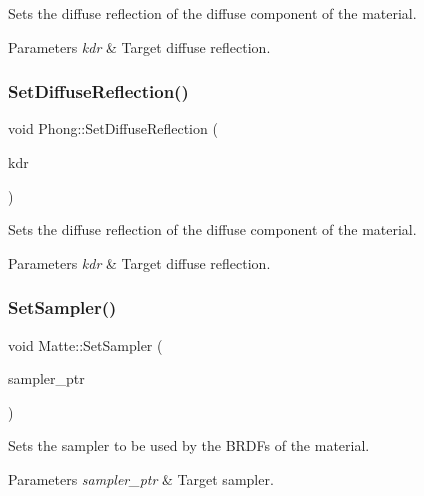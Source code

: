 Sets the diffuse reflection of the diffuse component of the material. 
\begin{DoxyParams}{Parameters}
{\em kdr} & Target diffuse reflection. \\
\hline
\end{DoxyParams}
\hypertarget{group___materials_ga7d9198210719a327b6c293955a9ecafe}{}\label{group___materials_ga7d9198210719a327b6c293955a9ecafe} 
\subsubsection{\texorpdfstring{Set\+Diffuse\+Reflection()}{SetDiffuseReflection()}\hspace{0.1cm}{\footnotesize\ttfamily [2/2]}}
{\footnotesize\ttfamily void Phong\+::\+Set\+Diffuse\+Reflection (\begin{DoxyParamCaption}\item[{const float}]{kdr }\end{DoxyParamCaption})\hspace{0.3cm}{\ttfamily [inline]}}

Sets the diffuse reflection of the diffuse component of the material. 
\begin{DoxyParams}{Parameters}
{\em kdr} & Target diffuse reflection. \\
\hline
\end{DoxyParams}
\hypertarget{group___materials_ga6b42d7c8b02c61801702dc19d8e3ba5a}{}\label{group___materials_ga6b42d7c8b02c61801702dc19d8e3ba5a} 
\subsubsection{\texorpdfstring{Set\+Sampler()}{SetSampler()}\hspace{0.1cm}{\footnotesize\ttfamily [1/2]}}
{\footnotesize\ttfamily void Matte\+::\+Set\+Sampler (\begin{DoxyParamCaption}\item[{std\+::shared\+\_\+ptr$<$ \hyperlink{class_sampler}{Sampler} $>$}]{sampler\+\_\+ptr }\end{DoxyParamCaption})\hspace{0.3cm}{\ttfamily [inline]}}

Sets the sampler to be used by the B\+R\+D\+Fs of the material. 
\begin{DoxyParams}{Parameters}
{\em sampler\+\_\+ptr} & Target sampler. \\
\hline
\end{DoxyParams}
\hypertarget{group___materials_ga76b02c8e5a8dfff0a24c929b37a47c0c}{}\label{group___materials_ga76b02c8e5a8dfff0a24c929b37a47c0c} 
